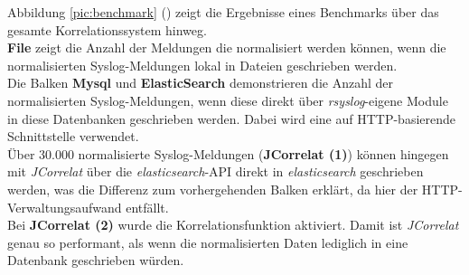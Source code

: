 Abbildung \ref{pic:benchmark} (\cite{reissmann}) zeigt die Ergebnisse eines Benchmarks 
über das gesamte Korrelationssystem hinweg.\\

\textbf{File} zeigt die Anzahl der Meldungen die normalisiert werden können, wenn die 
normalisierten Syslog-Meldungen lokal in Dateien geschrieben werden.\\

Die Balken \textbf{Mysql} und \textbf{ElasticSearch} demonstrieren die Anzahl der 
normalisierten Syslog-Meldungen, wenn diese direkt über \textit{rsyslog}-eigene Module in 
diese Datenbanken geschrieben werden. Dabei wird eine auf HTTP-basierende Schnittstelle 
verwendet.\\

Über 30.000 normalisierte Syslog-Meldungen (\textbf{JCorrelat (1)}) können hingegen mit 
\textit{JCorrelat} über die \textit{elasticsearch}-API direkt in \textit{elasticsearch} 
geschrieben werden, was die Differenz zum vorhergehenden Balken erklärt, da hier der 
HTTP-Verwaltungsaufwand entfällt.\\

Bei \textbf{JCorrelat (2)} wurde die Korrelationsfunktion aktiviert. Damit ist 
\textit{JCorrelat} genau so performant, als wenn die normalisierten Daten lediglich in 
eine Datenbank geschrieben würden.

